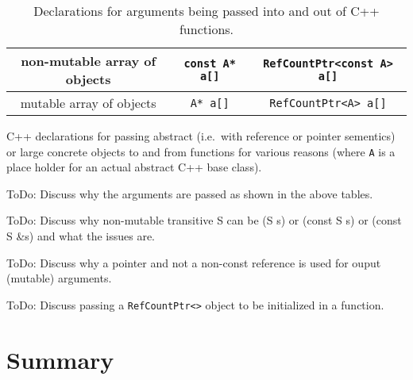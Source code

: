 \begin{table}
\begin{minipage}{\textwidth}
\begin{tabular}{|c|c|c|}
\hline
non-mutable array of objects
& \texttt{const A* a[]}
& \texttt{RefCountPtr<const A> a[]} \\
\hline
mutable array of objects
& \texttt{A* a[]}
& \texttt{RefCountPtr<A> a[]} \\
\hline
\end{tabular}
\begin{center}
C++ declarations for passing abstract (i.e.~with reference or pointer
sementics) or large concrete objects to and from functions for various
reasons (where \texttt{A} is a place holder for an actual abstract C++
base class).
\end{center}
\end{minipage}
%
\caption{Declarations for arguments being passed into and out of C++ functions.}
%
\end{table}

ToDo: Discuss why the arguments are passed as shown in the above
tables.

ToDo: Discuss why non-mutable transitive S can be (S s) or (const S s)
or (const S \&s) and what the issues are.

ToDo: Discuss why a pointer and not a non-const reference is used for
ouput (mutable) arguments.

ToDo: Discuss passing a \texttt{RefCountPtr<>} object to be initialized in a
function.

%
\section{Summary}
%
